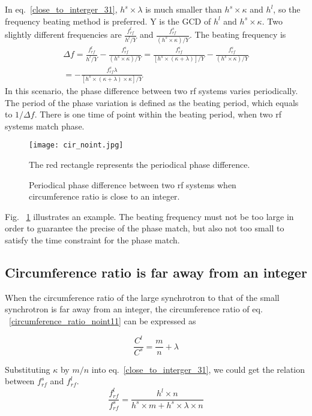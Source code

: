 In eq.~\ref{close_to_interger_31}, $h^s\times\lambda $ is much smaller than $h^s \times \kappa$ and $h^l$, so the frequency beating method is preferred. Y is the GCD of $h^l$ and $h^s \times \kappa$. Two slightly different frequencies are $\frac{f_{\mathit{rf}}^{l}}{h^l/Y}$ and $\frac{f_{\mathit{rf}}^{s}}{(h^s\times \kappa)/Y}$. The beating frequency is
\begin{equation} 
\begin{split}
\Delta f=\frac{f_{\mathit{rf}}^{l}}{h^l/Y}-\frac{f_{\mathit{rf}}^{s}}{(h^s\times \kappa)/Y}=\frac{f_{\mathit{rf}}^{s}}{[h^s\times (\kappa+\lambda)]/Y}-\frac{f_{\mathit{rf}}^{s}}{(h^s\times \kappa)/Y}\\=-\frac{f_{\mathit{rf}}^{s}\lambda}{[h^s\times (\kappa+\lambda)\times \kappa]/Y}
\end{split}
\end{equation}
In this scenario, the phase difference between two rf systems varies periodically. The period of the phase variation is defined as the beating period, which equals to $1/\Delta f$. There is one time of point within the beating period, when two rf systems match phase. 
\begin{figure}[!htb]
   \centering   
   \texttt{[image: cir\_noint.jpg]}
   \caption{Periodical phase difference between two rf systems when circumference ratio is close to an integer.}{The red rectangle represents the periodical phase difference.}
   \label{cir_noint}
\end{figure} 

Fig. ~\ref{cir_noint} illustrates an example.
The beating frequency must not be too large in order to guarantee the precise of the phase match, but also not too small to satisfy the time constraint for the phase match. 

\subsection{Circumference ratio is far away from an integer}
When the circumference ratio of the large synchrotron to that of the small synchrotron is far away from an integer, the circumference ratio of eq. ~\ref{circumference_ratio_noint11} can be expressed as

\begin{equation}
\frac{C^l}{C^s}=\frac{m}{n}+ \lambda \label{circumference_ratio_noint11}
\end{equation}

Substituting $\kappa$ by $m/n$ into eq.~\ref{close_to_interger_31}, we could get the relation between $f_{\mathit{rf}}^{s}$ and $f_{\mathit{rf}}^{l}$.
\begin{equation} 
\frac{f_{\mathit{rf}}^{l}}{f_{\mathit{rf}}^{s}}=\frac{h^l\times n}{h^s \times m+ h^s \times\lambda\times n}\label{close_to_interger11}
\end{equation}

